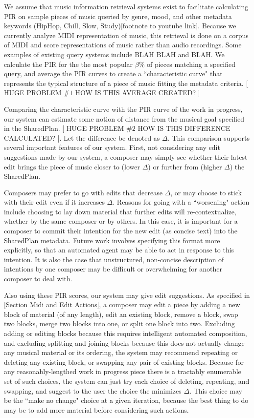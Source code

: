 \documentclass[final,authoryear,5p,times,twocolumn]{elsarticle}
\begin{document}
We assume that music information retrieval systems exist to facilitate calculating PIR on sample pieces of music queried by genre, mood, and other metadata keywords (HipHop, Chill, Slow, Study)[footnote to youtube link]. Because we currently analyze MIDI representation of music, this retrieval is done on a corpus of MIDI and score representations of music rather than audio recordings. Some examples of existing query systems include BLAH BLAH and BLAH. We calculate the PIR for the the most popular $\beta \%$ of pieces matching a specified query, and average the PIR curves to create a ``characteristic curve" that represents the typical structure of a piece of music fitting the metadata criteria. [ HUGE PROBLEM $\#1$ HOW IS THIS AVERAGE CREATED? ]

Comparing the characteristic curve with the PIR curve of the work in progress, our system can estimate some notion of distance from the musical goal specified in the SharedPlan. [ HUGE PROBLEM $\#2$ HOW IS THIS DIFFERENCE CALCULATED? ]. Let the difference be denoted as $\Delta$. This comparison supports several important features of our system. First, not considering any edit suggestions made by our system, a composer may simply see whether their latest edit brings the piece of music closer to (lower $\Delta$) or further from (higher $\Delta$) the SharedPlan.

Composers may prefer to go with edits that decrease $\Delta$, or may choose to stick with their edit even if it increases $\Delta$. Reasons for going with a ``worsening" action include choosing to lay down material that further edits will re-contextualize, whether by the same composer or by others. In this case, it is important for a composer to commit their intention for the new edit (as concise text) into the SharedPlan metadata. Future work involves specifying this format more explicitly, so that an automated agent may be able to act in response to this intention. It is also the case that unstructured, non-concise description of intentions by one composer may be difficult or overwhelming for another composer to deal with.

Also using these PIR scores, our system may give edit suggestions. As specified in [Section Midi and Edit Actions], a composer may edit a piece by adding a new block of material (of any length), edit an existing block, remove a block, swap two blocks, merge two blocks into one, or split one block into two. Excluding adding or editing blocks because this requires intelligent automated composition, and excluding splitting and joining blocks because this does not actually change any musical material or its ordering, the system may recommend repeating or deleting any existing block, or swapping any pair of existing blocks. Because for any reasonably-lengthed work in progress piece there is a tractably enumerable set of such choices, the system can just try each choice of deleting, repeating, and swapping, and suggest to the user the choice the minimizes $\Delta$. This choice may be the ``make no change" choice at a given iteration, because the best thing to do may be to add more material before considering such actions.
\end{document}
